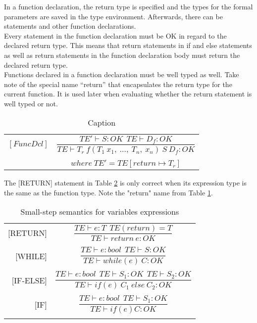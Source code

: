 In a function declaration, the return type is specified and the types for the formal parameters are saved in the type environment. Afterwards, there can be statements and other function declarations. \\
Every statement in the function declaration must be OK in regard to the declared return type. This means that return statements in if and else statements as well as return statements in the function declaration body must return the declared return type. \\
Functions declared in a function declaration must be well typed as well.
Take note of the special name “return” that encapsulates the return type for the current function. It is used later when evaluating whether the return statement is well typed or not.
\begin{table}[H]
    \begin{center}
    \begin{longtable}[c] { r c }
        $[FuncDcl]$ 
        & 
        \( \dfrac{TE' \vdash S : OK \ \ TE \vdash D_{f}: OK} 
        {T E \vdash T_r \ f(T_1 \ x_1,\ ...,\ T_n,\ x_n)\ S\ D_f : OK} \) 
        \\ \\
        & 
        \( {where \ TE' = TE[return \mapsto T_r]} \)
    \end{longtable}
    \end{center}
    \caption{Caption}
    \label{sem:func-type}
\end{table}

The [RETURN] statement in Table \ref{sem:bool-ass22} is only correct when its expression type is the same as the function type. Note the "return" name from Table \ref{sem:func-type}.
\begin{longtable}[c] { r c }
\centering

[RETURN] & \(
\dfrac{TE \vdash e : T\ \ TE(return) = T}
  {TE \vdash return \ e : OK} \) \\
& \\

[WHILE] & \(
\dfrac{TE \vdash e : bool \ \ TE \vdash S : OK}
  {TE \vdash while(e) \ C : OK} \) \\
& \\

[IF-ELSE] & \( 
\dfrac{TE \vdash e : bool \ \ TE \vdash S_1 : OK \ \ TE \vdash S_2 : OK}
  {TE \vdash if (e) \ C_1  \ else \ C_2 : OK} \) \\
& \\

[IF] & \(
\dfrac{TE \vdash e : bool \ \ TE \vdash S_1 : OK}
  {TE \vdash if (e) C : OK} \) \\

\caption{Small-step semantics for variables expressions}
\label{sem:bool-ass22}
\end{longtable}

